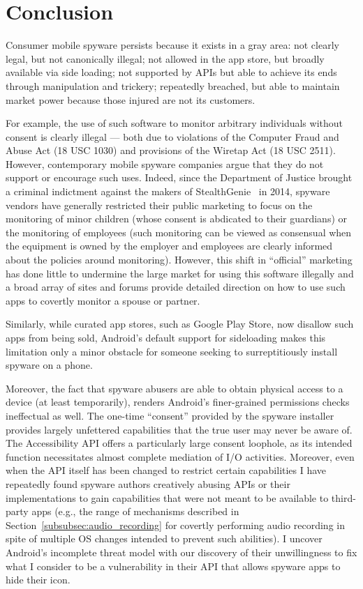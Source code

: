 \section{Conclusion}
Consumer mobile spyware persists because it exists in a gray area: not
clearly legal, but not canonically illegal; not allowed in the app
store, but broadly available via side loading; not supported by APIs
but able to achieve its ends through manipulation and trickery;
repeatedly breached, but able to maintain market power because those
injured are not its customers.

For example, the use of such software to monitor arbitrary individuals
without consent is clearly illegal --- both due to violations of the
Computer Fraud and Abuse Act (18 USC 1030) and provisions of the
Wiretap Act (18 USC 2511).  However, contemporary mobile spyware
companies argue that they do not support or encourage such uses.
Indeed, since the Department of Justice brought a criminal indictment
against the makers of StealthGenie~\cite{dojstealthgenie} in 2014,
spyware vendors have generally restricted their public marketing to
focus on the monitoring of minor children (whose consent is abdicated
to their guardians) or the monitoring of employees (such monitoring
can be viewed as consensual when the equipment is owned by the
employer and employees are clearly informed about the policies around
monitoring).  However, this shift in ``official'' marketing has done
little to undermine the large market for using this software illegally
and a broad array of sites and forums provide detailed direction on
how to use such apps to covertly monitor a spouse or partner.

Similarly, while curated app stores, such as Google Play Store, now
disallow such apps from being sold, Android's default support for
sideloading makes this limitation only a minor obstacle for someone
seeking to surreptitiously install spyware on a
phone.

Moreover, the fact that spyware abusers are able to obtain physical
access to a device (at least temporarily), renders Android's
finer-grained permissions checks ineffectual as well.  The one-time
``consent'' provided by the spyware installer provides largely
unfettered capabilities that the true user may never be aware of.  The
Accessibility API offers a particularly large consent loophole, as its
intended function necessitates almost complete mediation of I/O
activities.  Moreover, even when the API itself has been changed to
restrict certain capabilities I have repeatedly found spyware authors
creatively abusing APIs or their implementations to gain capabilities
that were not meant to be available to third-party apps
(e.g., the range of mechanisms described in
Section~\ref{subsubsec:audio_recording} for covertly performing audio
recording in spite of multiple OS changes intended to prevent such
abilities). I uncover Android's incomplete threat model
with our discovery of their unwillingness to fix what
I consider to be a vulnerability in their API that allows spyware apps to
hide their icon.

